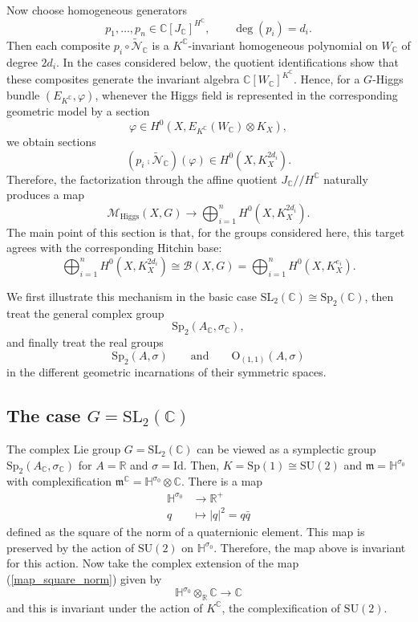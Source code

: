 \documentclass[oneside,11pt]{amsart}
\theoremstyle{definition}
\theoremstyle{remark}
\numberwithin{thm}{section}
\numberwithin{equation}{section}
\begin{document}
Now choose homogeneous generators
\[
p_1,\dots,p_n\in\mathbb C[J_{\mathbb C}]^{H^{\mathbb C}},\qquad \deg(p_i)=d_i.
\]
Then each composite $p_i\circ\widetilde{\mathcal N}_{\mathbb C}$ is a $K^{\mathbb{C}}$-invariant homogeneous polynomial on $W_{\mathbb{C}}$ of degree $2d_i$. In the cases considered below, the quotient identifications show that these composites generate the invariant algebra $\mathbb C[W_{\mathbb C}]^{K^{\mathbb C}}$. Hence, for a $G$-Higgs bundle $(E_{K^{\mathbb{C}}},\varphi)$, whenever the Higgs field is represented in the corresponding geometric model by a section
\[
\varphi\in H^0(X,E_{K^{\mathbb{C}}}(W_{\mathbb C})\otimes K_X),
\] 
we obtain sections
\[
(p_i\comp \tilde{\mathcal{N}}_{\mathbb{C}})(\varphi)\in H^0(X,K_X^{2d_i}).
\]
Therefore, the factorization through the affine quotient $J_{\mathbb C}/\!\!/H^{\mathbb C}$ naturally produces a map
\[
\mathcal M_{\mathrm{Higgs}}(X,G)\longrightarrow \bigoplus_{i=1}^{n} H^0(X,K_X^{2d_i}).
\]
The main point of this section is that, for the groups considered here, this target agrees with the corresponding Hitchin base:
\[
\bigoplus_{i=1}^{n} H^0(X,K_X^{2d_i}) \cong \mathcal B(X,G)=\bigoplus_{i=1}^{n} H^0(X,K_X^{e_i}).
\]

We first illustrate this mechanism in the basic case $\mathrm{SL}_2(\mathbb{C})\cong\mathrm{Sp}_2(\mathbb{C})$, then treat the general complex group 
\[
\mathrm{Sp}_2(A_{\mathbb C},\sigma_{\mathbb C}),
\]
and finally treat the real groups
\[
\mathrm{Sp}_2(A,\sigma)\qquad \text{and} \qquad \mathrm O_{(1,1)}(A,\sigma)
\]
in the different geometric incarnations of their symmetric spaces.

 
\subsection{The case \texorpdfstring{$G=\mathrm{SL}_2( \mathbb{C})$}{G=SL(2,C)}}
The complex Lie group $G=\mathrm{SL}_2( \mathbb{C})$ can be viewed as a symplectic group $\mathrm{Sp}_2(A_{\mathbb{C}}, \sigma_{\mathbb{C}})$ for $A=\mathbb{R}$ and $\sigma = \mathrm{Id}$. Then, $K= \mathrm{Sp}(1) \cong  \mathrm{SU}(2)$ and $\mathfrak{m}=\mathbb{H}^{\sigma_0}$ with complexification $\mathfrak{m}^{\mathbb{C}}= \mathbb{H}^{\sigma_0} \otimes \mathbb{C}$. There is a map 
\begin{align}\label{map_square_norm}
\mathbb{H}^{\sigma_0} & \to \mathbb{R}^+ \\
q & \mapsto \vert q\vert ^2=q\bar{q} \nonumber
\end{align}
defined as the square of the norm of a quaternionic element. This map is preserved by the action of $\mathrm{SU}(2)$ on $\mathbb{H}^{\sigma_0}$. Therefore, the map above is invariant for this action. Now take the complex extension of the map (\ref{map_square_norm}) given by 
\[\mathbb{H}^{\sigma_0} \otimes_{\mathbb{R}} \mathbb{C}  \to \mathbb{C}\]
and this is invariant under the action of $K^{\mathbb{C}}$, the complexification of $\mathrm{SU}(2)$. 
\end{document}
